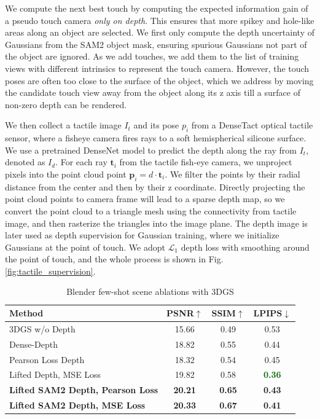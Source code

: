 \documentclass[letterpaper, 10 pt, conference]{ieeeconf}  %
\newcommand{\darkgreenbold}[1]{\textbf{\textcolor{darkgreen}{#1}}}%
\begin{document}
We compute the next best touch by computing the expected information gain of a pseudo touch camera \textit{only on depth}. This ensures that more spikey and hole-like areas along an object are selected. We first only compute the depth uncertainty of Gaussians from the SAM2 object mask, ensuring spurious Gaussians not part of the object are ignored. As we add touches, we add them to the list of training views with different intrinsics to represent the touch camera. However, the touch poses are often too close to the surface of the object, which we address by moving the candidate touch view away from the object along its z axis till a surface of non-zero depth can be rendered. 



We then collect a tactile image $I_t$ and its pose $p_i$ from a DenseTact \cite{do2022densetact} optical tactile sensor, where a fisheye camera fires rays to a soft hemispherical silicone surface. We use a pretrained DenseNet model \cite{DenseNet} to predict the depth along the ray from $I_t$, denoted as $I_d$. For each ray $\boldsymbol{t}_i$ from the tactile fish-eye camera, we unproject pixels into the point cloud point $\boldsymbol{p}_i = d \cdot \boldsymbol{t}_i$. We filter the points by their radial distance from the center and then by their z coordinate. Directly projecting the point cloud points to camera frame will lead to a sparse depth map, so we convert the point cloud to a triangle mesh using the connectivity from tactile image, and then rasterize the triangles into the image plane. The depth image is later used as depth supervision for Gaussian training, where we initialize Gaussians at the point of touch. We adopt $\mathcal{L}_1$ depth loss with smoothing around the point of touch, and the whole process is shown in Fig. \ref{fig:tactile_supervision}.



  \begin{table}[t]
    \vspace{5mm}
    \centering
    \begin{tabular}{lccc}
    \toprule
    Method & PSNR$\uparrow$ & SSIM$\uparrow$ & LPIPS$\downarrow$ \\
    \midrule
    \gls*{3DGS} w/o Depth  & 15.66 & 0.49 & 0.53 \\
    Dense-Depth \cite{chung2024depthregularized}  & {18.82} & {0.55} & {0.44}\\
    Pearson Loss Depth & 18.32 & 0.54 & 0.45  \\
    Lifted Depth, MSE Loss & 19.82 & 0.58 & \darkgreenbold{0.36} \\
    \textbf{Lifted SAM2 Depth, Pearson Loss} & \textbf{20.21} &\textbf{0.65} & \textbf{0.43} \\
    \textbf{Lifted SAM2 Depth, MSE Loss} & \textbf{20.33} & \textbf{0.67} & \textbf{0.41} \\
    \bottomrule
    \end{tabular}
    \caption{Blender few-shot scene ablations with \gls*{3DGS}}    
    \label{tab:ablation-results}
    \vspace{-4mm}
    \end{table}
\end{document}
